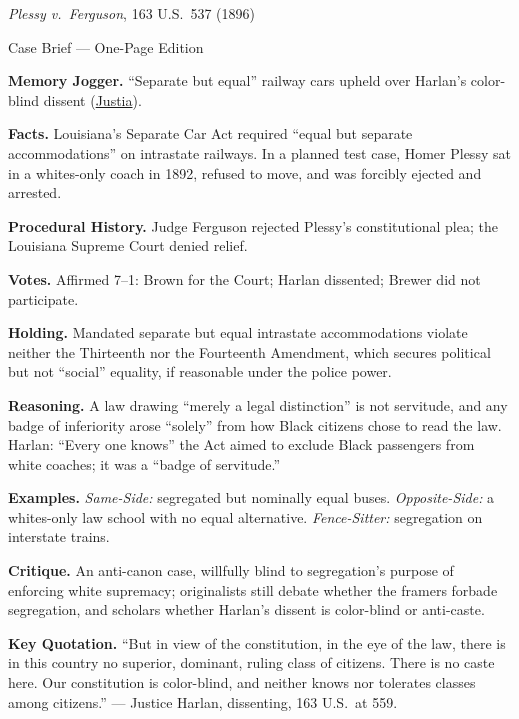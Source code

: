 \documentclass[12pt]{article}
\begin{document}
\begin{center}
{\Large \textit{Plessy v.\ Ferguson}, 163 U.S.\ 537 (1896)\par}
\vspace{0.3em}
{\normalsize Case Brief --- One-Page Edition\par}
\end{center}

\textbf{Memory Jogger.} ``Separate but equal'' railway cars upheld over Harlan's color-blind dissent (\href{https://supreme.justia.com/cases/federal/us/163/537/}{Justia}).

\textbf{Facts.} Louisiana's Separate Car Act required ``equal but separate accommodations'' on intrastate railways. In a planned test case, Homer Plessy sat in a whites-only coach in 1892, refused to move, and was forcibly ejected and arrested.

\textbf{Procedural History.} Judge Ferguson rejected Plessy's constitutional plea; the Louisiana Supreme Court denied relief.

\textbf{Votes.} Affirmed 7--1: Brown for the Court; Harlan dissented; Brewer did not participate.

\textbf{Holding.} Mandated separate but equal intrastate accommodations violate neither the Thirteenth nor the Fourteenth Amendment, which secures political but not ``social'' equality, if reasonable under the police power.

\textbf{Reasoning.} A law drawing ``merely a legal distinction'' is not servitude, and any badge of inferiority arose ``solely'' from how Black citizens chose to read the law. Harlan: ``Every one knows'' the Act aimed to exclude Black passengers from white coaches; it was a ``badge of servitude.''

\textbf{Examples.} \emph{Same-Side:} segregated but nominally equal buses. \emph{Opposite-Side:} a whites-only law school with no equal alternative. \emph{Fence-Sitter:} segregation on interstate trains.

\textbf{Critique.} An anti-canon case, willfully blind to segregation's purpose of enforcing white supremacy; originalists still debate whether the framers forbade segregation, and scholars whether Harlan's dissent is color-blind or anti-caste.

\textbf{Key Quotation.} ``But in view of the constitution, in the eye of the law, there is in this country no superior, dominant, ruling class of citizens. There is no caste here. Our constitution is color-blind, and neither knows nor tolerates classes among citizens.'' --- Justice Harlan, dissenting, 163 U.S.\ at 559.
\end{document}
